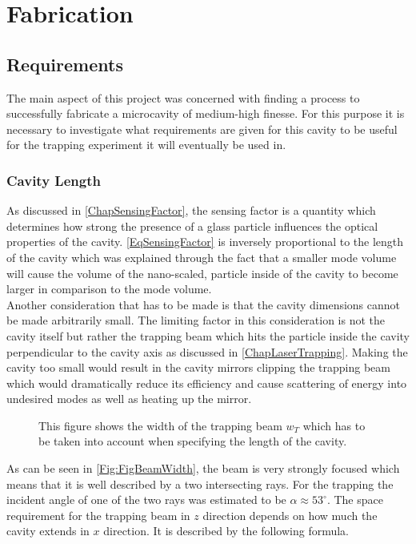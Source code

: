 \chapter{Fabrication}
\section{Requirements}
The main aspect of this project was concerned with finding a process to successfully fabricate a microcavity of medium-high finesse. For this purpose it is necessary to investigate what requirements are given for this cavity to be useful for the trapping experiment it will eventually be used in.
\subsection{Cavity Length}\label{ChapCavityLength}
As discussed in \autoref{ChapSensingFactor}, the sensing factor is a quantity which determines how strong the presence of a glass particle influences the optical properties of the cavity. \autoref{EqSensingFactor} is inversely proportional to the length of the cavity which was explained through the fact that a smaller mode volume will cause the volume of the nano-scaled, particle inside of the cavity to become larger in comparison to the mode volume.\\
Another consideration that has to be made is that the cavity dimensions cannot be made arbitrarily small. The limiting factor in this consideration is not the cavity itself but rather the trapping beam which hits the particle inside the cavity perpendicular to the cavity axis as discussed in \autoref{ChapLaserTrapping}. Making the cavity too small would result in the cavity mirrors clipping the trapping beam which would dramatically reduce its efficiency and cause scattering of energy into undesired modes as well as heating up the mirror.
\begin{figure}[H]
	
	\caption{This figure shows the width of the trapping beam $w_{\si{T}}$ which has to be taken into account when specifying the length of the cavity.}
	\label{Fig:FigBeamWidth}
\end{figure}
As can be seen in \autoref{Fig:FigBeamWidth}, the beam is very strongly focused which means that it is well described by a two intersecting rays. For the trapping the incident angle of one of the two rays was estimated to be $\alpha\approx 53^\circ$. The space requirement for the trapping beam in $z$ direction depends on how much the cavity extends in $x$ direction. It is described by the following formula.
